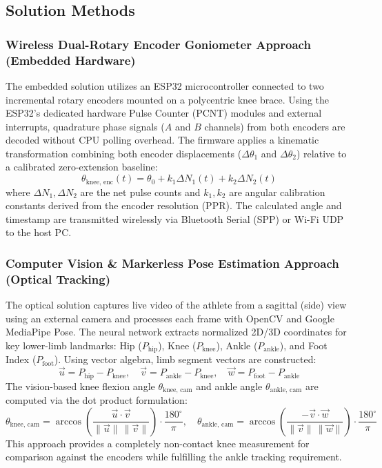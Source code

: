 \documentclass[11pt, a4paper]{article}
\begin{document}
\subsection{Solution Methods}

\subsubsection{Wireless Dual-Rotary Encoder Goniometer Approach (Embedded Hardware)}
The embedded solution utilizes an ESP32 microcontroller connected to two incremental rotary encoders mounted on a polycentric knee brace. Using the ESP32's dedicated hardware Pulse Counter (PCNT) modules and external interrupts, quadrature phase signals ($A$ and $B$ channels) from both encoders are decoded without CPU polling overhead. The firmware applies a kinematic transformation combining both encoder displacements ($\Delta\theta_1$ and $\Delta\theta_2$) relative to a calibrated zero-extension baseline:
\[
\theta_{\text{knee, enc}}(t) = \theta_0 + k_1 \Delta N_1(t) + k_2 \Delta N_2(t)
\]
where $\Delta N_1, \Delta N_2$ are the net pulse counts and $k_1, k_2$ are angular calibration constants derived from the encoder resolution (PPR). The calculated angle and timestamp are transmitted wirelessly via Bluetooth Serial (SPP) or Wi-Fi UDP to the host PC.

\subsubsection{Computer Vision \& Markerless Pose Estimation Approach (Optical Tracking)}
The optical solution captures live video of the athlete from a sagittal (side) view using an external camera and processes each frame with OpenCV and Google MediaPipe Pose. The neural network extracts normalized 2D/3D coordinates for key lower-limb landmarks: Hip ($P_{\text{hip}}$), Knee ($P_{\text{knee}}$), Ankle ($P_{\text{ankle}}$), and Foot Index ($P_{\text{foot}}$). Using vector algebra, limb segment vectors are constructed:
\[
\vec{u} = P_{\text{hip}} - P_{\text{knee}}, \quad \vec{v} = P_{\text{ankle}} - P_{\text{knee}}, \quad \vec{w} = P_{\text{foot}} - P_{\text{ankle}}
\]
The vision-based knee flexion angle $\theta_{\text{knee, cam}}$ and ankle angle $\theta_{\text{ankle, cam}}$ are computed via the dot product formulation:
\[
\theta_{\text{knee, cam}} = \arccos\left(\frac{\vec{u} \cdot \vec{v}}{\|\vec{u}\| \, \|\vec{v}\|}\right) \cdot \frac{180^\circ}{\pi}, \quad
\theta_{\text{ankle, cam}} = \arccos\left(\frac{-\vec{v} \cdot \vec{w}}{\|\vec{v}\| \, \|\vec{w}\|}\right) \cdot \frac{180^\circ}{\pi}
\]
This approach provides a completely non-contact knee measurement for comparison against the encoders while fulfilling the ankle tracking requirement.
\end{document}
